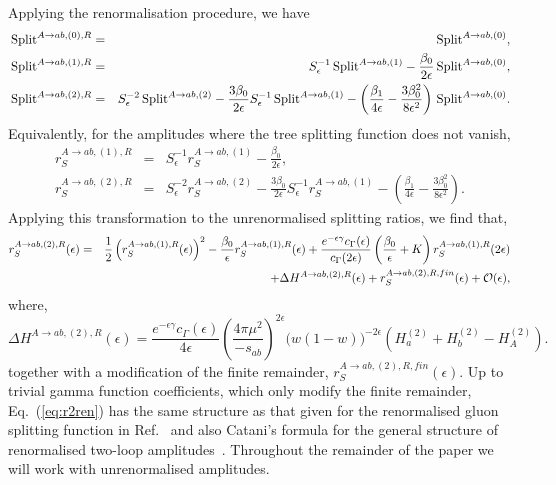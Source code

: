 \documentclass[paper,notoc,nohyper]{JHEP3}
\def\e{\epsilon}
\def\Split{\, {\rm Split}}
\def\e{\epsilon}
\begin{document}
Applying the renormalisation procedure, we have 
\begin{eqnarray}
\Split^{A \to ab,(0),R}  &=& \Split^{A \to ab,(0)} ,
 \nonumber \\
\Split^{A \to ab,(1),R}  &=& 
S_\e^{-1} \Split^{A \to ab,(1)} 
-\frac{\beta_0}{2\e} \Split^{A \to ab,(0)}  ,  \nonumber \\
\Split^{A \to ab,(2),R} &=& 
S_\e^{-2} \Split^{A \to ab,(2)}  
-\frac{3\beta_0}{2\e} S_\e^{-1}
\Split^{A \to ab,(1)}  
-\left(\frac{\beta_1}{4\e}-\frac{3\beta_0^2}{8\e^2}\right)
\Split^{A \to ab,(0)}.
\end{eqnarray}
Equivalently, for the amplitudes where the tree splitting function does not
vanish,
\begin{eqnarray}
r_S^{A \to ab,(1),R}  &=& 
S_\e^{-1} r_S^{A \to ab,(1)} 
-\frac{\beta_0}{2\e}    ,  \nonumber \\
r_S^{A \to ab,(2),R} &=& 
S_\e^{-2} r_S^{A \to ab,(2)}  
-\frac{3\beta_0}{2\e} S_\e^{-1}
r_S^{A \to ab,(1)}  
-\left(\frac{\beta_1}{4\e}-\frac{3\beta_0^2}{8\e^2}\right).
\end{eqnarray}
Applying this transformation to the unrenormalised splitting ratios, we find
that,
\begin{eqnarray}
\label{eq:r2ren}
r_{S}^{A \to ab,(2),R}(\e) &=& 
\frac{1}{2}\left(r_{S}^{A \to ab,(1),R}(\e)\right)^2
-\frac{\beta_0}{\e}r_{S}^{A \to ab,(1),R}(\e)
+\frac{e^{-\epsilon\gamma}c_{\Gamma}(\e)}{c_{\Gamma}(2\e)}\left(\frac{\beta_0}{\e}+K\right )r_{S}^{A \to ab,(1),R}(2\e)\nonumber \\
&&
+\Delta H^{A \to ab,(2),R}(\e) 
+r_{S}^{A \to ab,(2),R,fin}(\epsilon) + {\cal O}(\epsilon),
\end{eqnarray}
where,
\begin{equation}
\Delta H^{A \to ab,(2),R}(\e) = \frac{e^{-\epsilon\gamma}c_\Gamma(\e) }{4 \epsilon}
\left(\frac{4\pi\mu^2}{-s_{ab}}\right)^{2\epsilon}\big (w(1-w)\big)^{-2\e}
\left(H^{(2)}_a+H^{(2)}_b-H^{(2)}_A\right).
\end{equation}
together with a modification of the finite remainder, $r_{S}^{A \to
ab,(2),R,fin}(\epsilon)$.
Up to trivial gamma function coefficients, which only modify the finite
remainder, Eq.~(\ref{eq:r2ren}) has the same structure as that given for the
renormalised gluon splitting function in  Ref.~\cite{Bern:2lsplit} and also
Catani's formula for the 
general structure of renormalised two-loop amplitudes~\cite{Catani:polestruc}. 
Throughout the remainder of the paper we will work with unrenormalised amplitudes.
\end{document}
